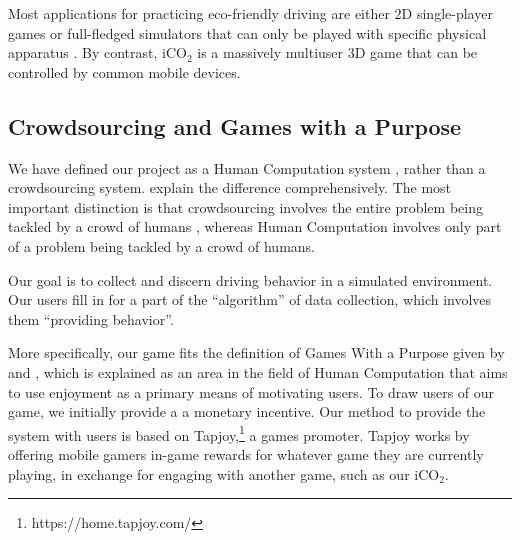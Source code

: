 \documentclass[preprint,authoryear,12pt]{elsarticle}
\begin{document}
Most applications for practicing eco-friendly driving are either 2D single-player games \citep{EcoGame1, EcoGame2, TruckEcoGame, Moebius, FiatEcoGame} or full-fledged simulators that can only be played with specific physical apparatus \citep{EcoSimulator, GreenDino, EcoSimulator2, sabrina2013enhanced}. By contrast, iCO$_2$ is a massively multiuser 3D game that can be controlled by common mobile devices.


\subsection{Crowdsourcing and Games with a Purpose}
\label{subsec:csandgwap}

We have defined our project as a Human Computation system \citep{Yuen.2009,Krause+Smeddinck.2011}, rather than a crowdsourcing system.
\cite{Quinn} explain the difference comprehensively. The most important distinction is that crowdsourcing involves the entire problem being tackled by a crowd of humans \citep{howe2008crowdsourcing}, whereas Human Computation involves only part of a problem being tackled by a crowd of humans.

Our goal is to collect and discern driving behavior in a simulated environment. Our users fill in for a part of the ``algorithm'' of data collection, which involves them ``providing behavior''.

More specifically, our game fits the definition of Games With a Purpose given by \cite{Quinn} and \cite{vonAhn2006Games}, which is explained as an area in the field of Human Computation that aims to use enjoyment as a primary means of motivating users.
To draw users of our game, we initially provide a a monetary incentive. Our method to provide the system with users is based on Tapjoy,\footnote{https://home.tapjoy.com/} a games promoter. Tapjoy works by offering mobile gamers in-game rewards for whatever game they are currently playing, in exchange for engaging with another game, such as our iCO$_2$.
\end{document}
